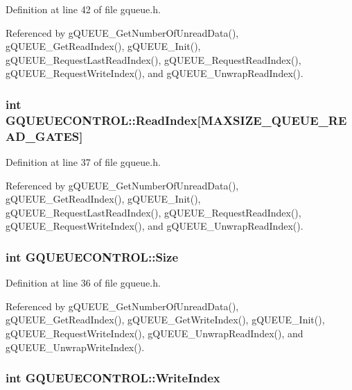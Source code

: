 Definition at line 42 of file gqueue.h.



Referenced by gQUEUE\_\-GetNumberOfUnreadData(), gQUEUE\_\-GetReadIndex(), gQUEUE\_\-Init(), gQUEUE\_\-RequestLastReadIndex(), gQUEUE\_\-RequestReadIndex(), gQUEUE\_\-RequestWriteIndex(), and gQUEUE\_\-UnwrapReadIndex().

\hypertarget{structGQUEUECONTROL_aed43ab94887b0e203a23877fb26988b6}{
\subsubsection[{ReadIndex}]{\setlength{\rightskip}{0pt plus 5cm}int {\bf GQUEUECONTROL::ReadIndex}\mbox{[}MAXSIZE\_\-QUEUE\_\-READ\_\-GATES\mbox{]}}}
\label{structGQUEUECONTROL_aed43ab94887b0e203a23877fb26988b6}


Definition at line 37 of file gqueue.h.



Referenced by gQUEUE\_\-GetNumberOfUnreadData(), gQUEUE\_\-GetReadIndex(), gQUEUE\_\-Init(), gQUEUE\_\-RequestLastReadIndex(), gQUEUE\_\-RequestReadIndex(), gQUEUE\_\-RequestWriteIndex(), and gQUEUE\_\-UnwrapReadIndex().

\hypertarget{structGQUEUECONTROL_a4db75bcca77dbc6ea7d8d5c3cd3a365f}{
\subsubsection[{Size}]{\setlength{\rightskip}{0pt plus 5cm}int {\bf GQUEUECONTROL::Size}}}
\label{structGQUEUECONTROL_a4db75bcca77dbc6ea7d8d5c3cd3a365f}


Definition at line 36 of file gqueue.h.



Referenced by gQUEUE\_\-GetNumberOfUnreadData(), gQUEUE\_\-GetReadIndex(), gQUEUE\_\-GetWriteIndex(), gQUEUE\_\-Init(), gQUEUE\_\-RequestWriteIndex(), gQUEUE\_\-UnwrapReadIndex(), and gQUEUE\_\-UnwrapWriteIndex().

\hypertarget{structGQUEUECONTROL_a614237a6b5ee3fca394e40a0274d5b43}{
\subsubsection[{WriteIndex}]{\setlength{\rightskip}{0pt plus 5cm}int {\bf GQUEUECONTROL::WriteIndex}}}
\label{structGQUEUECONTROL_a614237a6b5ee3fca394e40a0274d5b43}


